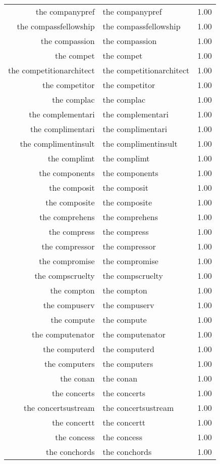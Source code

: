 \begin{table}[ht]
\begin{tabular}{rlr}
  the companypref & the companypref & 1.00 \\ 
  the compassfellowship & the compassfellowship & 1.00 \\ 
  the compassion & the compassion & 1.00 \\ 
  the compet & the compet & 1.00 \\ 
  the competitionarchitect & the competitionarchitect & 1.00 \\ 
  the competitor & the competitor & 1.00 \\ 
  the complac & the complac & 1.00 \\ 
  the complementari & the complementari & 1.00 \\ 
  the complimentari & the complimentari & 1.00 \\ 
  the complimentinsult & the complimentinsult & 1.00 \\ 
  the complimt & the complimt & 1.00 \\ 
  the components & the components & 1.00 \\ 
  the composit & the composit & 1.00 \\ 
  the composite & the composite & 1.00 \\ 
  the comprehens & the comprehens & 1.00 \\ 
  the compress & the compress & 1.00 \\ 
  the compressor & the compressor & 1.00 \\ 
  the compromise & the compromise & 1.00 \\ 
  the compscruelty & the compscruelty & 1.00 \\ 
  the compton & the compton & 1.00 \\ 
  the compuserv & the compuserv & 1.00 \\ 
  the compute & the compute & 1.00 \\ 
  the computenator & the computenator & 1.00 \\ 
  the computerd & the computerd & 1.00 \\ 
  the computers & the computers & 1.00 \\ 
  the conan & the conan & 1.00 \\ 
  the concerts & the concerts & 1.00 \\ 
  the concertsustream & the concertsustream & 1.00 \\ 
  the concertt & the concertt & 1.00 \\ 
  the concess & the concess & 1.00 \\ 
  the conchords & the conchords & 1.00 \\ 

\end{tabular}
\end{table}
